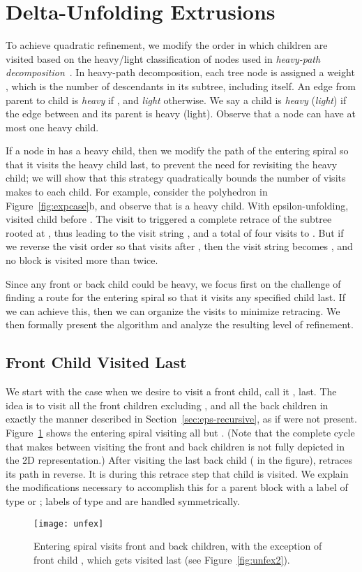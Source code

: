 \documentclass[11pt]{article}
\begin{document}
\section{Delta-Unfolding Extrusions}
\label{sec:Delta}

To achieve quadratic refinement, we modify the
order in which children are visited
based on the heavy/light classification of nodes used in
\emph{heavy-path decomposition}~\cite{Sleator-Tarjan-1983}.
In heavy-path decomposition,
each tree node  is
assigned a weight , which is the number of descendants in its
subtree, including itself.  An edge from parent  to child  is
\emph{heavy} if , and \emph{light} otherwise. We say a child
 is \emph{heavy} (\emph{light}) if the edge between  and its parent is heavy (light). Observe that
a node can have at most one heavy child.

If a node  in  has a heavy child, then we modify the
path of the entering spiral  so
that it visits the heavy child last, to prevent the need for revisiting the heavy child; we will show that this strategy quadratically bounds the
number of visits  makes to each child.
For example, consider the polyhedron in Figure~\ref{fig:expcase}b, and observe that
 is a heavy child. With epsilon-unfolding,  visited child 
before . The visit to  triggered a complete retrace of the subtree rooted
at , thus leading to the visit string ,
and a total of four visits to .
But if we reverse the visit order so that  visits  after ,
then the visit
string becomes , and no
block is visited more than twice.


Since any front or back child could be heavy, we focus first on the challenge of
finding a route for the entering spiral so that it visits any specified child
last.
If we can achieve this, then we can organize the visits to minimize
retracing.
We then
formally present the algorithm and
analyze the resulting level of refinement.

\subsection{Front Child Visited Last}
\label{sec:heavyfront}

We start with the case when we desire to visit
a front child, call it , last.
The idea is to visit all the front children excluding ,
and all the back children in exactly the manner described in Section~\ref{sec:eps-recursive}, as if  were not present.
Figure~\ref{fig:unfex} shows the entering spiral  visiting all
but .
(Note that the complete cycle that  makes between
 visiting the front and back children is not fully depicted in the
2D representation.)
After visiting the last back child ( in the figure),  retraces its
path in reverse.
It is during this retrace step that child  is visited.
We explain the modifications necessary to accomplish this for a parent block
 with a label of type  or ; labels of type  and  are handled symmetrically.
\begin{figure}[htbp]
\centering
\texttt{[image: unfex]}
\caption{Entering spiral  visits front and back children, with the exception of front child ,
which gets visited last (see Figure~\ref{fig:unfex2}).}
\label{fig:unfex}
\end{figure}
\end{document}
